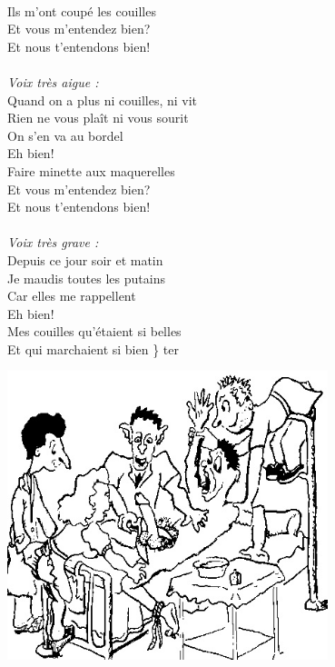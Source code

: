 \\Ils m'ont coupé les couilles
\\Et vous m'entendez bien?
\\Et nous t'entendons bien!
\\\\\textit{Voix très aigue :}
\\Quand on a plus ni couilles, ni vit \bissimple
\\Rien ne vous plaît ni vous sourit \bissimple
\\On s'en va au bordel
\\Eh bien!
\\Faire minette aux maquerelles
\\Et vous m'entendez bien?
\\Et nous t'entendons bien!
\\\\\textit{Voix très grave :}
\\Depuis ce jour soir et matin \bissimple
\\Je maudis toutes les putains \bissimple
\\Car elles me rappellent
\\Eh bien!
\\Mes couilles qu'étaient si belles
\\Et qui marchaient si bien \}  ter
\begin{center}
   \includegraphics[width=0.7\textwidth]{images/cuvier.jpg}
 \end{center}

\breakpage